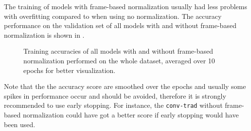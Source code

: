 \FloatBarrier
\noindent
The training of models with frame-based normalization usually had less problems with overfitting compared to when using no normalization.
The accuracy performance on the validation set of all models with and without frame-based normalization is shown in .
\begin{figure}[!ht]
  \centering
  \caption{Training accuracies of all models with and without frame-based normalization performed on the whole dataset, averaged over 10 epochs for better visualization.}
  \label{fig:exp_final_acc}
\end{figure}
\FloatBarrier
\noindent
Note that the the accuracy score are smoothed over the epochs and usually some spikes in performance occur and should be avoided, therefore it is strongly recommended to use early stopping.
For instance, the \texttt{conv-trad} without frame-based normalization could have got a better score if early stopping would have been used.

